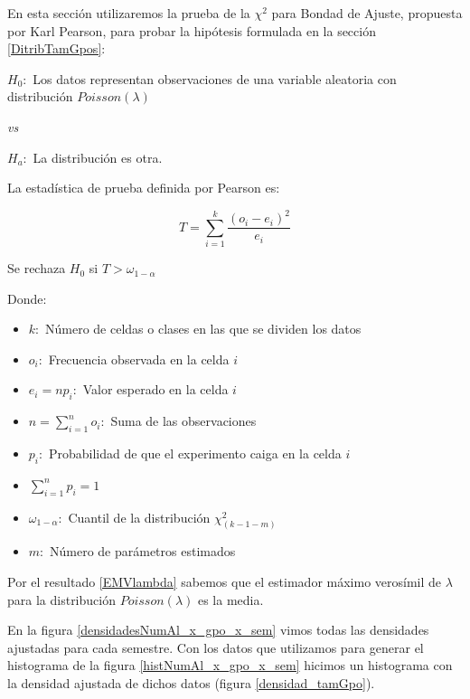En esta sección utilizaremos la prueba de la $\chi^{2}$ para Bondad de Ajuste, propuesta por Karl Pearson, para probar la hipótesis formulada en la sección \ref{DitribTamGpos}: 

$H_{0}: $ Los datos representan observaciones de una variable aleatoria con distribución $Poisson(\lambda)$

\textit{vs}

$H_{a}: $ La distribución es otra.


La estadística de prueba definida por Pearson es:

\begin{equation}
T = \displaystyle \sum_{i = 1}^{k} \dfrac{(\textit{o}_{i} - \textit{e}_{i})^{2}}{\textit{e}_{i}}
\end{equation}

Se rechaza $H_{0}$ si $T > \omega_{1-\alpha}$


Donde:

\begin{itemize}
\item[ ] $k:$ Número de celdas o clases en las que se dividen los datos

\item[ ] $\textit{o}_{i}:$ Frecuencia observada en la celda $i$

\item[ ] $\textit{e}_{i} = n p_{i}:$ Valor esperado  en la celda $i$

\item[ ] $n = \displaystyle \sum_{i = 1}^{n} o_{i}:$ Suma de las observaciones

\item[ ] $p_{i}:$ Probabilidad de que el experimento caiga en la celda $i$

\item[ ] $\displaystyle \sum_{i = 1}^{n} p_{i} = 1$

\item[ ] $\omega_{1-\alpha}:$ Cuantil de la distribución $\chi_{(k-1-m)}^{2}$

\item[ ] $m:$ Número de parámetros estimados %
\end{itemize}

Por el resultado \ref{EMVlambda} sabemos que el estimador máximo verosímil de $\lambda$ para la distribución $Poisson(\lambda)$ es la media.


En la figura \ref{densidadesNumAl_x_gpo_x_sem} vimos todas las densidades ajustadas para cada semestre. Con los datos que utilizamos para generar el histograma de la figura \ref{histNumAl_x_gpo_x_sem} hicimos un histograma con la densidad ajustada de dichos datos (figura \ref{densidad_tamGpo}).

